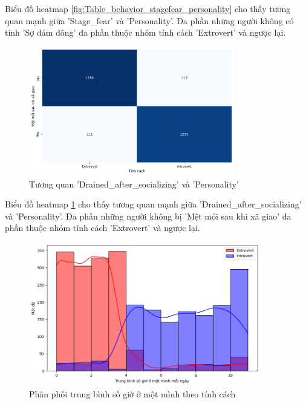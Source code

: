    \FloatBarrier

    Biểu đồ heatmap \ref{fig:Table_behavior_stagefear_personality} cho thấy tương quan mạnh giữa 'Stage\_fear' và 'Personality'. Đa phần những người không có tính 'Sợ đám đông' đa phần thuộc nhóm tính cách 'Extrovert' và ngược lại.

    \begin{figure}[htp]
        \centering
        \includegraphics[width=0.8\textwidth]{images/Table_behavior_drain_personality.png}
        \caption{Tương quan 'Drained\_after\_socializing' và 'Personality'}
        \label{fig:Table_behavior_drain_personality}
    \end{figure}

    \FloatBarrier

    Biểu đồ heatmap \ref{fig:Table_behavior_drain_personality} cho thấy tương quan mạnh giữa 'Drained\_after\_socializing' và 'Personality'. Đa phần những người không bị 'Mệt mỏi sau khi xã giao' đa phần thuộc nhóm tính cách 'Extrovert' và ngược lại.

    \begin{figure}[htp]
        \centering
        \includegraphics[width=0.9\textwidth]{images/Table_behavior_timealone_personality.png}
        \caption{Phân phối trung bình số giờ ở một mình theo tính cách}
        \label{fig:Table_behavior_timealone_personality}
    \end{figure}
    \FloatBarrier

